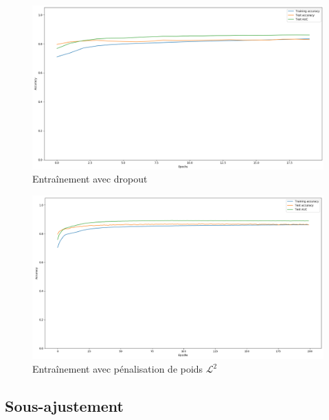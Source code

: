 \documentclass[a4paper,11pt]{article}
\begin{document}
	\begin{figure}[H]
	    \centering
	    \includegraphics[scale=0.3]{overfitting_with_dropout.png}
	    \caption{Entraînement avec dropout}
	    \label{fig:overfitting_with_dropout}
	\end{figure}

	\begin{figure}[H]
	    \centering
	    \includegraphics[scale=0.3]{l2_regularization_200.png}
	    \caption{Entraînement avec pénalisation de poids $\mathcal{L}^2$}
	    \label{fig:l2_regularization}
	\end{figure}

\subsection{Sous-ajustement}
\label{sec:sous-ajustement}
\end{document}
